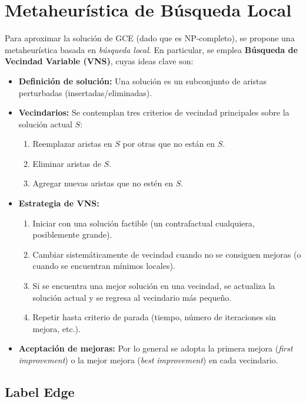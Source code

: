 \documentclass[a4paper]{article}
\begin{document}
\section{Metaheurística de Búsqueda Local}

Para aproximar la solución de GCE (dado que es NP-completo), se propone una metaheurística basada en \emph{búsqueda local}.  
En particular, se emplea \textbf{Búsqueda de Vecindad Variable (VNS)}, cuyas ideas clave son:

\begin{itemize}
    \item \textbf{Definición de solución:} 
    Una solución es un subconjunto de aristas perturbadas (insertadas/eliminadas).
    \item \textbf{Vecindarios:} 
    Se contemplan tres criterios de vecindad principales sobre la solución actual $S$:
    \begin{enumerate}
        \item Reemplazar aristas en $S$ por otras que no están en $S$. 
        \item Eliminar aristas de $S$. 
        \item Agregar nuevas aristas que no estén en $S$. 
    \end{enumerate}
    \item \textbf{Estrategia de VNS:} 
    \begin{enumerate}
        \item Iniciar con una solución factible (un contrafactual cualquiera, posiblemente grande).  
        \item Cambiar sistemáticamente de vecindad cuando no se consiguen mejoras (o cuando se encuentran mínimos locales).  
        \item Si se encuentra una mejor solución en una vecindad, se actualiza la solución actual y se regresa al vecindario más pequeño.  
        \item Repetir hasta criterio de parada (tiempo, número de iteraciones sin mejora, etc.). 
    \end{enumerate}
    \item \textbf{Aceptación de mejoras:} 
    Por lo general se adopta la primera mejora (\emph{first improvement}) o la mejor mejora (\emph{best improvement}) en cada vecindario.
\end{itemize}

\subsection{Label Edge}
\end{document}
